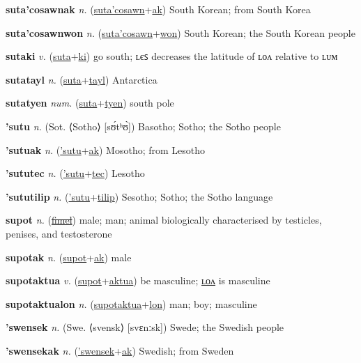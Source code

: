 \textbf{\hypertarget{suta'cosawnak}{suta'cosawnak}} \textit{n.} (\hyperlink{suta'cosawn}{suta'cosawn}+\allowbreak \hyperlink{ak}{ak})
South Korean; from South Korea

\textbf{\hypertarget{suta'cosawnwon}{suta'cosawnwon}} \textit{n.} (\hyperlink{suta'cosawn}{suta'cosawn}+\allowbreak \hyperlink{won}{won})
South Korean; the South Korean people

\textbf{\hypertarget{sutaki}{sutaki}} \textit{v.} (\hyperlink{suta}{suta}+\allowbreak \hyperlink{ki}{ki})
go south; ʟєꜱ decreases the latitude of ʟᴏᴧ relative to ʟᴜᴍ

\textbf{\hypertarget{sutatayl}{sutatayl}} \textit{n.} (\hyperlink{suta}{suta}+\allowbreak \hyperlink{tayl}{tayl})
Antarctica

\textbf{\hypertarget{sutatyen}{sutatyen}} \textit{num.} (\hyperlink{suta}{suta}+\allowbreak \hyperlink{tyen}{tyen})
south pole

\textbf{\hypertarget{'sutu}{'sutu}} \textit{n.} (Sot. ⟨Sotho⟩ [sʊ́tʰʊ̀])
Basotho; Sotho; the Sotho people

\textbf{\hypertarget{'sutuak}{'sutuak}} \textit{n.} (\hyperlink{'sutu}{'sutu}+\allowbreak \hyperlink{ak}{ak})
Mosotho; from Lesotho

\textbf{\hypertarget{'sututec}{'sututec}} \textit{n.} (\hyperlink{'sutu}{'sutu}+\allowbreak \hyperlink{tec}{tec})
Lesotho

\textbf{\hypertarget{'sututilip}{'sututilip}} \textit{n.} (\hyperlink{'sutu}{'sutu}+\allowbreak \hyperlink{tilip}{tilip})
Sesotho; Sotho; the Sotho language

\textbf{\hypertarget{supot}{supot}} \textit{n.} (\hyperlink{fimel}{\sout{fimel}})
male; man; animal biologically characterised by testicles, penises, and testosterone

\textbf{\hypertarget{supotak}{supotak}} \textit{n.} (\hyperlink{supot}{supot}+\allowbreak \hyperlink{ak}{ak})
male

\textbf{\hypertarget{supotaktua}{supotaktua}} \textit{v.} (\hyperlink{supot}{supot}+\allowbreak \hyperlink{aktua}{aktua})
be masculine; \hyperlink{supotaktualon}{ʟᴏᴧ} is masculine

\textbf{\hypertarget{supotaktualon}{supotaktualon}} \textit{n.} (\hyperlink{supotaktua}{supotaktua}+\allowbreak \hyperlink{lon}{lon})
man; boy; masculine

\textbf{\hypertarget{'swensek}{'swensek}} \textit{n.} (Swe. ⟨svensk⟩ [svɛnːsk])
Swede; the Swedish people

\textbf{\hypertarget{'swensekak}{'swensekak}} \textit{n.} (\hyperlink{'swensek}{'swensek}+\allowbreak \hyperlink{ak}{ak})
Swedish; from Sweden

